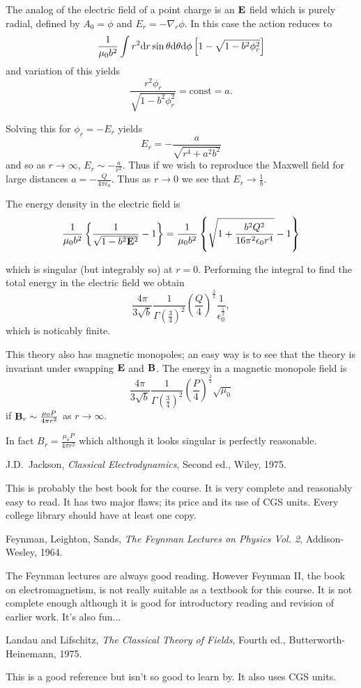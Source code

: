 \documentclass{notes}
\newcommand{\B}{\vect{B}}
\newcommand{\E}{\vect{E}}
\begin{document}
The analog of the electric field of a point charge is an $\E$ field
which is purely radial, defined by $A_0 = \phi$ and
$E_r = - \nabla_r \phi$.  In this case the action reduces to
\[
\frac{1}{\mu_0 b^2} \int r^2 \mathrm{d} r \sin \theta \mathrm{d} \theta \mathrm{d} \phi
\left[ 1 - \sqrt{1 - b^2 \phi_r^2} \right]
\]
and variation of this yields
\[
\frac{r^2 \phi_r}{\sqrt{1 - b^2 \phi_r^2}} = \text{const} = a.
\]

Solving this for $\phi_r = -E_r$ yields
\[
E_r = - \frac{a}{\sqrt{r^4 + a^2 b^2}}
\]
and so as $r \to \infty$, $E_r \sim -\frac{a}{r^2}$.  Thus if we wish
to reproduce the Maxwell field for large distances $a = -\frac{Q}{4
  \pi \epsilon_0}$.  Thus as $r \to 0$ we see that $E_r \to \frac{1}{b}$.

The energy density in the electric field is
\[
\frac{1}{\mu_0 b^2} \left\{\frac{1}{\sqrt{1 - b^2 \E^2}} - 1\right\}
= \frac{1}{\mu_0 b^2} \left\{\sqrt{1 + \frac{b^2 Q^2}{16 \pi^2
\epsilon_0 r^4}} - 1 \right\}
\]

which is singular (but integrably so) at $r=0$.  Performing the integral
to find the total energy in the electric field we obtain
\[
\frac{4 \pi}{3 \sqrt{b}} \frac{1}{\Gamma(\tfrac{3}{4})^2} \left( \frac{Q}{4}
\right)^{\frac{3}{2}} \frac{1}{\epsilon_0^{\frac{1}{2}}},
\]
which is noticably finite.

This theory also has magnetic monopoles; an easy way is to see that the
theory is invariant under swapping $\E$ and $\B$.  The energy in
a magnetic monopole field is
\[
\frac{4 \pi}{3 \sqrt{b}} \frac{1}{\Gamma(\tfrac{3}{4})^2}
\left( \frac{P}{4}\right)^{\frac{3}{2}} \sqrt{\mu_0}
\]
if $\B_r \sim \frac{\mu_0 P}{4 \pi r^2}$ as $r \to \infty$.

In fact $B_r = \frac{\mu_0 P}{4 \pi r^2}$ which although it looks singular
is perfectly reasonable.

\backmatter

\begin{thebibliography}{9}
 J.D.~Jackson, \emph{Classical Electrodynamics},
  Second ed., Wiley, 1975.
  
  {\sffamily \small This is probably the best book for the course.  It
    is very complete and reasonably easy to read.  It has two major
    flaws; its price and its use of CGS units.  Every college library
    should have at least one copy. }

 Feynman, Leighton, Sands, \emph{The Feynman Lectures
    on Physics Vol. 2}, Addison-Wesley, 1964.
  
  {\sffamily \small The Feynman lectures are always good reading.
    However Feynman II, the book on electromagnetism, is not really
    suitable as a textbook for this course.  It is not complete
    enough although it is good for introductory reading and revision
    of earlier work. It's also fun... }

 Landau and Lifschitz, \emph{The Classical Theory of
    Fields}, Fourth ed., Butterworth-Heinemann, 1975.
  
  {\sffamily \small This is a good reference but isn't so good to
    learn by.  It also uses CGS units.}
\end{thebibliography}
\end{document}
